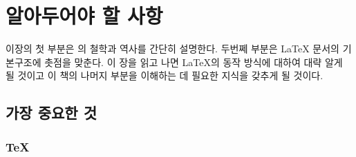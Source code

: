 \chapter{알아두어야 할 사항}
\begin{intro}
이장의 첫 부분은 \LaTeXe 의 철학과 역사를 간단히 설명한다.
두번쩨 부분은 \LaTeX{} 문서의 기본구조에 촛점을 맞춘다.
이 장을 읽고 나면 \LaTeX 의 동작 방식에 대하여 대략 알게 될 것이고 이  책의 나머지 부분을 이해하는 데 필요한 지식을 갖추게 될 것이다.
\end{intro}
\section{가장 중요한 것}
\subsection{\TeX}
 
